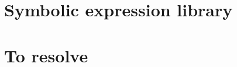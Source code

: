 \documentclass[11pt]{article}
\begin{document}
% 

\section{Symbolic expression library}





% 
% 
% 
% 

\section{To resolve}
\end{document}
